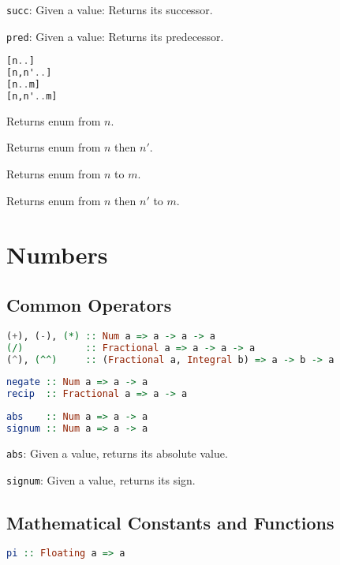 \documentclass[twocolumn,english]{article}
\begin{document}
\texttt{succ}: Given a value: Returns its successor.

\texttt{pred}: Given a value: Returns its predecessor.

\begin{lstlisting}[language=Haskell,frame=single]
[n..]
[n,n'..]
[n..m]
[n,n'..m]
\end{lstlisting}


Returns enum from $n$.

Returns enum from $n$ then $n'$.

Returns enum from $n$ to $m$.

Returns enum from $n$ then $n'$ to $m$.


\section{Numbers}


\subsection{Common Operators}

\begin{lstlisting}[language=Haskell,frame=single]
(+), (-), (*) :: Num a => a -> a -> a
(/)           :: Fractional a => a -> a -> a
(^), (^^)     :: (Fractional a, Integral b) => a -> b -> a
\end{lstlisting}


\begin{lstlisting}[language=Haskell,frame=single]
negate :: Num a => a -> a
recip  :: Fractional a => a -> a
\end{lstlisting}


\begin{lstlisting}[language=Haskell,frame=single]
abs    :: Num a => a -> a
signum :: Num a => a -> a
\end{lstlisting}


\texttt{abs}: Given a value, returns its absolute value.

\texttt{signum}: Given a value, returns its sign.


\subsection{Mathematical Constants and Functions}

\begin{lstlisting}[language=Haskell,frame=single]
pi :: Floating a => a
\end{lstlisting}
\end{document}
